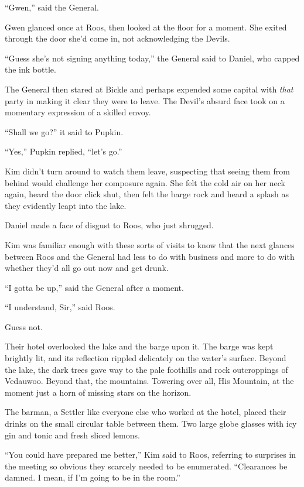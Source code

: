\documentclass[11pt,a5paper]{article}
\begin{document}
``Gwen,'' said the General.

Gwen glanced once at Roos, then looked at the floor for a moment. She exited through the door she'd come in, not acknowledging the Devils.

``Guess she's not signing anything today,'' the General said to Daniel, who capped the ink bottle.

The General then stared at Bickle and perhaps expended some capital with \emph{that} party in making it clear they were to leave. The Devil's absurd face took on a momentary expression of a skilled envoy.

``Shall we go?'' it said to Pupkin.

``Yes,'' Pupkin replied, ``let's go.''

Kim didn't turn around to watch them leave, suspecting that seeing them from behind would challenge her composure again. She felt the cold air on her neck again, heard the door click shut, then felt the barge rock and heard a splash as they evidently leapt into the lake.

Daniel made a face of disgust to Roos, who just shrugged.

Kim was familiar enough with these sorts of visits to know that the next glances between Roos and the General had less to do with business and more to do with whether they'd all go out now and get drunk.

``I gotta be up,'' said the General after a moment.

``I understand, Sir,'' said Roos.

Guess not.

\vspace{1em}

Their hotel overlooked the lake and the barge upon it. The barge was kept brightly lit, and its reflection rippled delicately on the water's surface. Beyond the lake, the dark trees gave way to the pale foothills and rock outcroppings of Vedauwoo. Beyond that, the mountains. Towering over all, His Mountain, at the moment just a horn of missing stars on the horizon.

The barman, a Settler like everyone else who worked at the hotel, placed their drinks on the small circular table between them. Two large globe glasses with icy gin and tonic and fresh sliced lemons.

``You could have prepared me better,'' Kim said to Roos, referring to surprises in the meeting so obvious they scarcely needed to be enumerated. ``Clearances be damned. I mean, if I'm going to be in the room.''
\end{document}
